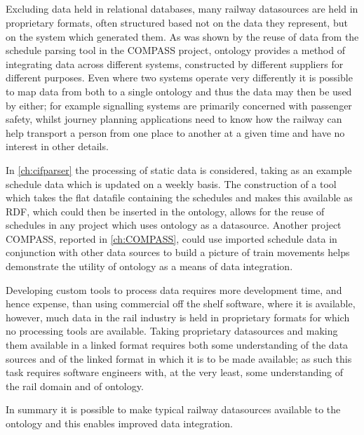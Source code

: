 \subsection{\QuestionOtherData}
Excluding data held in relational databases, many railway datasources are held in proprietary formats, often structured based not on the data they represent, but on the system which generated them. As was shown by the reuse of data from the schedule parsing tool in the COMPASS project, ontology provides a method of integrating data across different systems, constructed by different suppliers for different purposes. Even where two systems operate very differently it is possible to map data from both to a single ontology and thus the data may then be used by either; for example signalling systems are primarily concerned with passenger safety, whilst journey planning applications need to know how the railway can help transport a person from one place to another at a given time and have no interest in other details.

In \autoref{ch:cifparser} the processing of static data is considered, taking as an example schedule data which is updated on a weekly basis. The construction of a tool which takes the flat datafile containing the schedules and makes this available as RDF, which could then be inserted in the ontology, allows for the reuse of schedules in any project which uses ontology as a datasource. Another project COMPASS, reported in \autoref{ch:COMPASS}, could use imported schedule data in conjunction with other data sources to build a picture of train movements helps demonstrate the utility of ontology as a means of data integration. 

Developing custom tools to process data requires more development time, and hence expense, than using commercial off the shelf software, where it is available, however, much data in the rail industry is held in proprietary formats for which no processing tools are available. Taking proprietary datasources and making them available in a linked format requires both some understanding of the data sources and of the linked format in which it is to be made available; as such this task requires software engineers with, at the very least, some understanding of the rail domain and of ontology.

In summary it is possible to make typical railway datasources available to the ontology and this enables improved data integration.

